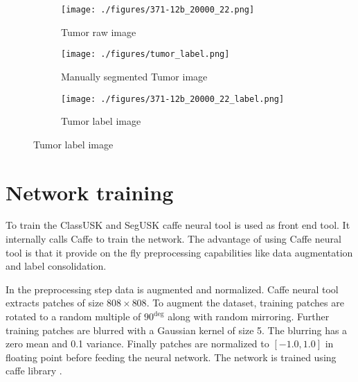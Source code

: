 \begin{figure}[h!]
    \begin{subfigure}{.3\textwidth}
         \centering
        \texttt{[image: ./figures/371-12b\_20000\_22.png]}
        \caption{Tumor raw image}
        \label{fig:healthy_raw}
    \end{subfigure}
  \begin{subfigure}{.3\textwidth}
        \centering
       \texttt{[image: ./figures/tumor\_label.png]}
        \caption{Manually segmented Tumor  image}
        \label{fig:healthy_raw}
    \end{subfigure}
    \begin{subfigure}{.3\textwidth}
        \centering
        \texttt{[image: ./figures/371-12b\_20000\_22\_label.png]}
        \caption{Tumor label image}
        \label{fig:healthy_label}
    \end{subfigure}
\end{figure}



\section{Network training}
To train the ClassUSK and SegUSK caffe neural tool\cite{Tschopp:Caffe-Neural-Tool} is used as front end tool. It internally calls Caffe to train the network. The advantage of using Caffe neural tool is that it provide on the fly preprocessing capabilities like data augmentation and label consolidation.

In the preprocessing step data is augmented and normalized.
Caffe neural tool extracts patches of size $808 \times 808$. To augment the dataset, training patches are rotated to a random multiple of $90^{\deg}$  along with
random mirroring. Further training patches are blurred with a Gaussian kernel of size
5. The blurring has a zero mean and 0.1 variance. Finally patches are normalized to
$ [-1.0, 1.0] $ in floating point before feeding the neural network. 
The network is trained  using caffe library \cite{jia2014caffe}. 


